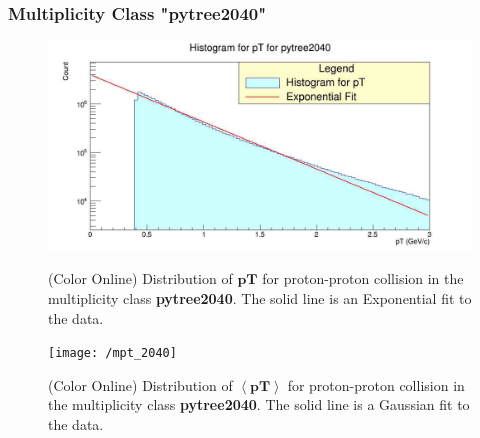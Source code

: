 \documentclass[letterpaper,aps,prc,superscriptaddress,nofootinbib,10pt,showpacs,floatfix]{revtex4-2}%
\begin{document}
\subsubsection{Multiplicity Class "pytree2040"}
\label{subsubsec:2040}
\vspace{-5mm}
\begin{figure}[!htb]
   \begin{minipage}{0.48\textwidth}
   \label{Fig:1a}
   \label{Fig:1b}
     \centering
     \renewcommand{\thefigure}{1a}
     \includegraphics[width=1.1\linewidth]{pt_2040}
     \caption{(Color Online) Distribution of $\mathbf{pT}$ for proton-proton collision in the multiplicity class \textbf{pytree2040}. The solid line is an Exponential fit to the data.}
   \end{minipage}\hfill
   \begin{minipage}{0.48\textwidth}
     \centering
     \renewcommand{\thefigure}{1b}
     \texttt{[image: /mpt\_2040]}
     \caption{(Color Online) Distribution of $\mathbf{\left<pT\right>}$ for proton-proton collision in the multiplicity class \textbf{pytree2040}. The solid line is a Gaussian fit to the data.}
   \end{minipage}
\end{figure}

\FloatBarrier
\vspace{-3mm}
\end{document}
